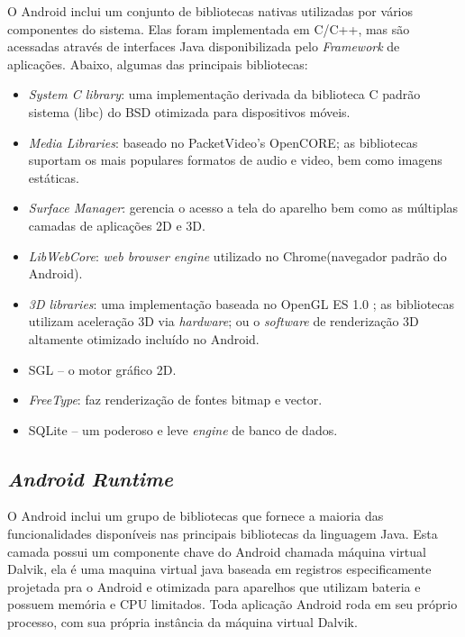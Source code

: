 O Android inclui um conjunto de bibliotecas nativas utilizadas por vários componentes do sistema. 
Elas foram implementada em C/C++, mas são acessadas através de interfaces Java \cite{android0} 
disponibilizada pelo \textit{Framework} de aplicações.
 Abaixo, algumas das principais bibliotecas:
  \begin{itemize}
   \item \textit{System C library}: uma implementação derivada da biblioteca C padrão sistema (libc) do BSD otimizada para dispositivos móveis.
   \item \textit{Media Libraries}: baseado no PacketVideo’s OpenCORE; as bibliotecas suportam os mais populares formatos de audio e video, bem como imagens estáticas.
   \item \textit{Surface Manager}: gerencia o acesso a tela do aparelho bem como as múltiplas camadas de aplicações 2D e 3D.
   \item \textit{LibWebCore}:  \textit {web browser engine} utilizado no Chrome(navegador padrão do Android).
   \item \textit{3D libraries}: uma implementação baseada no OpenGL ES 1.0 \cite{openGL}; as bibliotecas utilizam aceleração 3D via \textit{hardware}; 
   ou o \textit{software} de renderização 3D altamente otimizado incluído no Android.
   \item SGL – o motor gráfico 2D.
   \item \textit{FreeType}: faz renderização de fontes bitmap e vector.
   \item SQLite – um poderoso e leve \textit{engine} de banco de dados.
  \end{itemize}

\subsection{\textit{Android Runtime}}

O Android inclui um grupo de bibliotecas que fornece a maioria das 
funcionalidades disponíveis nas principais bibliotecas da linguagem Java.
Esta camada possui um componente chave do Android chamada máquina virtual Dalvik, 
ela é uma maquina virtual java  baseada em registros especificamente projetada pra o Android \cite{android1} e otimizada
 para aparelhos que utilizam bateria e possuem memória e CPU limitados.
Toda aplicação Android roda em seu próprio processo, com sua própria instância da máquina virtual Dalvik.

